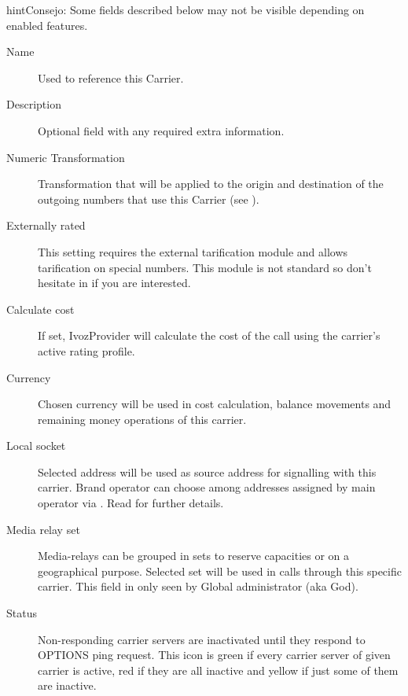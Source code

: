 \documentclass[letterpaper,10pt,spanish]{sphinxmanual}
\begin{document}
\begin{notice}{hint}{Consejo:}
Some fields described below may not be visible depending on enabled features.
\begin{description}
\item[{Name}] \leavevmode
Used to reference this Carrier.

\item[{Description}] \leavevmode
Optional field with any required extra information.

\item[{Numeric Transformation}] \leavevmode
Transformation that will be applied to the origin and destination of the
outgoing numbers that use this Carrier
(see {\hyperref[administration_portal/brand/settings/numeric_transformations:numeric\string-transformations]{}}).

\item[{Externally rated}] \leavevmode
This setting requires the external tarification module and allows
tarification on special numbers. This module is not standard so don't
hesitate in {\hyperref[basic_concepts/intro/getting_help:getting\string-help]{}} if you are interested.

\item[{Calculate cost}] \leavevmode
If set, IvozProvider will calculate the cost of the call using the carrier's active rating profile.

\item[{Currency}] \leavevmode
Chosen currency will be used in cost calculation, balance movements and
remaining money operations of this carrier.

\item[{Local socket}] \leavevmode
Selected address will be used as source address for signalling with this carrier. Brand operator can choose among
addresses assigned by main operator via {\hyperref[administration_portal/platform/brands:brands]{}}. Read {\hyperref[administration_portal/platform/infrastructure/proxy_trunks:proxy\string-trunks]{}} for further details.

\item[{Media relay set}] \leavevmode
Media-relays can be grouped in sets to reserve capacities or on a geographical purpose. Selected set will be used
in calls through this specific carrier. This field in only seen by Global administrator (aka God).

\item[{Status}] \leavevmode
Non-responding carrier servers are inactivated until they respond to OPTIONS ping request. This icon is green if
every carrier server of given carrier is active, red if they are all inactive and yellow if just some of them are inactive.

\end{description}
\end{notice}
\end{document}
